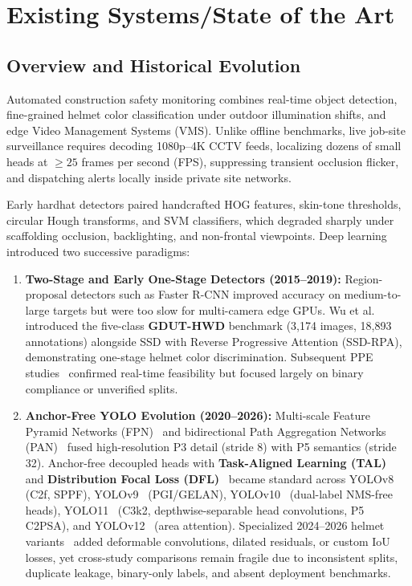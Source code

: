 \chapter{Existing Systems/State of the Art}
\label{chap:sota}

\section{Overview and Historical Evolution}

Automated construction safety monitoring combines real-time object detection, fine-grained helmet color classification under outdoor illumination shifts, and edge Video Management Systems (VMS). Unlike offline benchmarks, live job-site surveillance requires decoding 1080p--4K CCTV feeds, localizing dozens of small heads at $\ge 25$ frames per second (FPS), suppressing transient occlusion flicker, and dispatching alerts locally inside private site networks.

Early hardhat detectors paired handcrafted HOG features, skin-tone thresholds, circular Hough transforms, and SVM classifiers, which degraded sharply under scaffolding occlusion, backlighting, and non-frontal viewpoints. Deep learning introduced two successive paradigms:
\begin{enumerate}[leftmargin=1.8em, itemsep=2.5pt]
  \item \textbf{Two-Stage and Early One-Stage Detectors (2015--2019):} Region-proposal detectors such as Faster R-CNN improved accuracy on medium-to-large targets but were too slow for multi-camera edge GPUs. Wu et al.~\cite{wu2019hardhats} introduced the five-class \textbf{GDUT-HWD} benchmark (3,174 images, 18,893 annotations) alongside SSD with Reverse Progressive Attention (SSD-RPA), demonstrating one-stage helmet color discrimination. Subsequent PPE studies~\cite{nath2020deep,wang2021fast} confirmed real-time feasibility but focused largely on binary compliance or unverified splits.
  \item \textbf{Anchor-Free YOLO Evolution (2020--2026):} Multi-scale Feature Pyramid Networks (FPN)~\cite{lin2017feature} and bidirectional Path Aggregation Networks (PAN)~\cite{liu2018path} fused high-resolution P3 detail (stride 8) with P5 semantics (stride 32). Anchor-free decoupled heads with \textbf{Task-Aligned Learning (TAL)}~\cite{feng2021tood} and \textbf{Distribution Focal Loss (DFL)}~\cite{li2020generalized} became standard across YOLOv8~\cite{jocher2023yolov8} (C2f, SPPF), YOLOv9~\cite{wang2024yolov9} (PGI/GELAN), YOLOv10~\cite{wang2024yolov10} (dual-label NMS-free heads), YOLO11~\cite{ultralytics2024yolo11} (C3k2, depthwise-separable head convolutions, P5 C2PSA), and YOLOv12~\cite{tian2025yolov12} (area attention). Specialized 2024--2026 helmet variants~\cite{song2024improved,zhao2025yolodcrcf,song2025yolov8,wu2025advancing,chen2025improved,zuo2025enhanced,wang2026yolov11ncoalmine} added deformable convolutions, dilated residuals, or custom IoU losses, yet cross-study comparisons remain fragile due to inconsistent splits, duplicate leakage, binary-only labels, and absent deployment benchmarks.
\end{enumerate}

